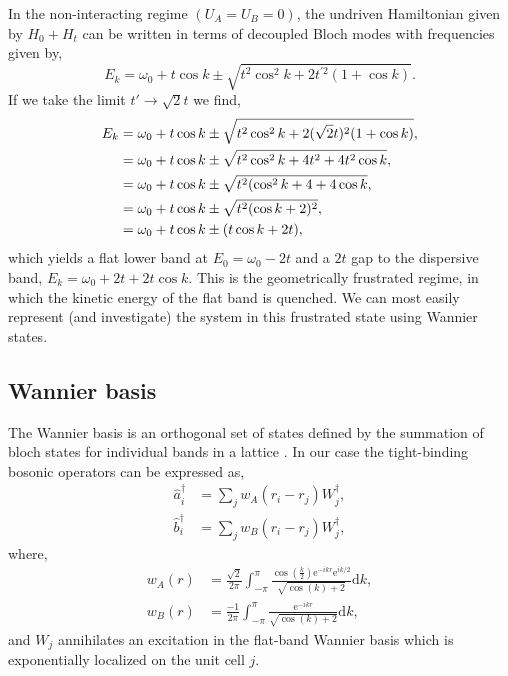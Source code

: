 In the non-interacting regime \((U_{A} = U_{B} = 0)\), the undriven Hamiltonian given by \(H_{0} + H_{t}\) can be written in terms of decoupled Bloch modes with frequencies given by,
\begin{equation}
	E_{k} = \omega_{0} + t \cos k \pm \sqrt{t^{2}\cos^{2}k + 2t^{'2}(1+\cos k)}.
	\label{eq:dim1-6}
\end{equation}
If we take the limit \(t' \rightarrow \sqrt{2}t\) we find,
\begin{align}
	E_{k} &= \omega_{0} + t \cos k \pm \sqrt{t^{2}\cos^{2}k + 2(\sqrt{2}t)^{2}(1+\cos k)}, \notag \\
	&= \omega_{0} + t \cos k \pm \sqrt{t^{2}\cos^{2}k + 4t^{2} + 4t^{2}\cos k}, \notag \\
	&= \omega_{0} + t \cos k \pm \sqrt{t^{2}(\cos^{2}k + 4 + 4\cos k}, \notag \\
	&= \omega_{0} + t \cos k \pm \sqrt{t^{2}(\cos k + 2)^{2}}, \notag \\
	&= \omega_{0} + t \cos k \pm (t\cos k + 2t),
	\label{eq:dim1-7}
\end{align}
which yields a flat lower band at \(E_{0} = \omega_{0} - 2t\) and a \(2t\) gap to the dispersive band, \(E_{k} = \omega_{0} + 2t + 2t\cos k\). This is the geometrically frustrated regime, in which the kinetic energy of the flat band is quenched. We can most easily represent (and investigate) the system in this frustrated state using Wannier states.

\subsection{Wannier basis} 
The Wannier basis is an orthogonal set of states defined by the summation of bloch states for individual bands in a lattice \cite{Wannier1937}. In our case the tight-binding bosonic operators can be expressed as,
\begin{align}
	\hat{a}_{i}^{\dagger} &= \sum_{j} w_{A}(r_{i} - r_{j}) W_{j}^{\dagger}, \label{eq:dim1-8} \\
	\hat{b}_{i}^{\dagger} &= \sum_{j} w_{B}(r_{i} - r_{j}) W_{j}^{\dagger}, \label{eq:dim1-9}  
\end{align}
where,
\begin{align}
	w_{A}(r) &= \frac{\sqrt{2}}{2\pi} \int^{\pi}_{-\pi} \frac{\cos\left(\frac{k}{2}\right)\mathrm{e}^{-ikr}\mathrm{e}^{ik/2}}{\sqrt{\cos(k) + 2}} \mathrm{d}k, \label{eq:dim1-10} \\
	w_{B}(r) &= \frac{-1}{2\pi} \int^{\pi}_{-\pi} \frac{\mathrm{e}^{-ikr}}{\sqrt{\cos(k) + 2}} \mathrm{d}k, \label{eq:dim1-11}
\end{align}
and \(W_{j}\) annihilates an excitation in the flat-band Wannier basis which is exponentially localized on the unit cell \(j\).

